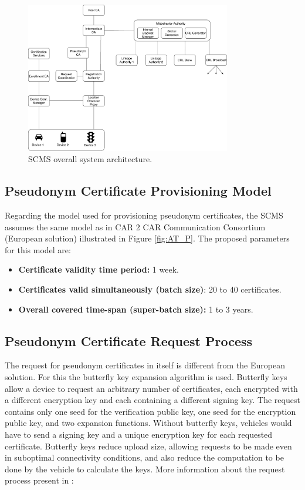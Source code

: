 \begin{figure}
	\centering
	\includegraphics[width=0.8\textwidth]{Figures/SCMS_PKI.pdf}
	\caption{\label{fig:SCMS_PKI}SCMS overall system architecture.}
\end{figure}

\subsection{Pseudonym Certificate Provisioning Model}
\bigbreak
Regarding the model used for provisioning pseudonym certificates, the SCMS assumes the same model as in CAR 2 CAR Communication
Consortium \cite{generic_eu} (European solution) illustrated in Figure \ref{fig:AT_P}. The proposed parameters for this model are:
\begin{itemize}
	\item \textbf{Certificate validity time period:} 1 week.
	\item \textbf{Certificates valid simultaneously (batch size)}: 20 to 40 certificates.
	\item \textbf{Overall covered time-span (super-batch size):} 1 to 3 years.
\end{itemize}

\subsection{Pseudonym Certificate Request Process}

The request for pseudonym certificates in itself is different from the European solution. For this the
butterfly key expansion algorithm \cite{scms} is used. Butterfly keys allow a device to request an arbitrary number of certificates, each encrypted with a different encryption key and each containing a different signing key. The request contains only one seed for the verification public key, one seed for the encryption public key, and two expansion functions. Without butterfly keys, vehicles would have to send a signing key and a unique encryption key for each requested certificate. Butterfly keys reduce upload size, allowing requests to be made even in suboptimal connectivity conditions, and also reduce the computation to be done by the vehicle to calculate the keys. More information about the request process present in \cite{scms}:


